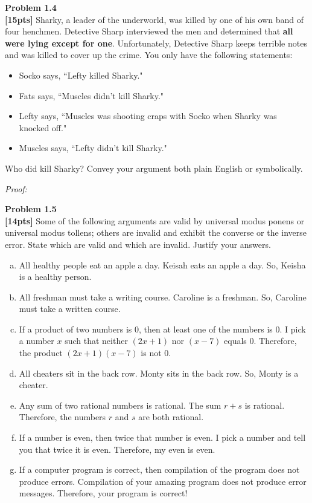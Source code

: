 \documentclass{article}
\newenvironment{problem}[2][Problem]
    { \begin{mdframed}[backgroundcolor=gray!20] \textbf{#1 #2} \\}
    {  \end{mdframed}}
\newenvironment{solution}
    {\textit{Proof:}}
    {}
\begin{document}
\begin{problem}{1.4}
\textbf{[15pts]} Sharky, a leader of the underworld, was killed by one of his own band of four henchmen. Detective Sharp interviewed the men and determined that \textbf{all were lying except for one}. Unfortunately, Detective Sharp keeps terrible notes and was killed to cover up the crime. You only have the following statements:
\begin{itemize}
    \item Socko says, ``Lefty killed Sharky."
    \item Fats says, ``Muscles didn't kill Sharky."
    \item Lefty says, ``Muscles was shooting craps with Socko when Sharky was knocked off."
    \item Muscles says, ``Lefty didn't kill Sharky."
\end{itemize}
Who did kill Sharky? Convey your argument both plain English or symbolically. 
\end{problem}

\begin{solution}
\end{solution}
\newpage %

\begin{problem}{1.5}
\textbf{[14pts]} Some of the following arguments are valid by universal modus ponens or universal modus tollens; others are invalid and exhibit the converse or the inverse error. State which are valid and which are invalid. Justify your answers.
\begin{enumerate}[a)]
\item All healthy people eat an apple a day. Keisah eats an apple a day. So, Keisha is a healthy person.
\item All freshman must take a writing course. Caroline is a freshman. So, Caroline must take a written course. 
\item If a product of two numbers is 0, then at least one of the numbers is 0. I pick a number $x$ such that neither $(2x+1)$ nor $(x-7)$ equals 0. Therefore, the product $(2x+1)(x-7)$ is not 0.
\item All cheaters sit in the back row. Monty sits in the back row. So, Monty is a cheater. 
\item Any sum of two rational numbers is rational. The sum $r+s$ is rational. Therefore, the numbers $r$ and $s$ are both rational. 
\item If a number is even, then twice that number is even. I pick a number and tell you that twice it is even. Therefore, my even is even. 
\item If a computer program is correct, then compilation of the program does not produce errors. Compilation of your amazing program does not produce error messages. Therefore, your program is correct!
\end{enumerate}
\end{problem}
\end{document}
